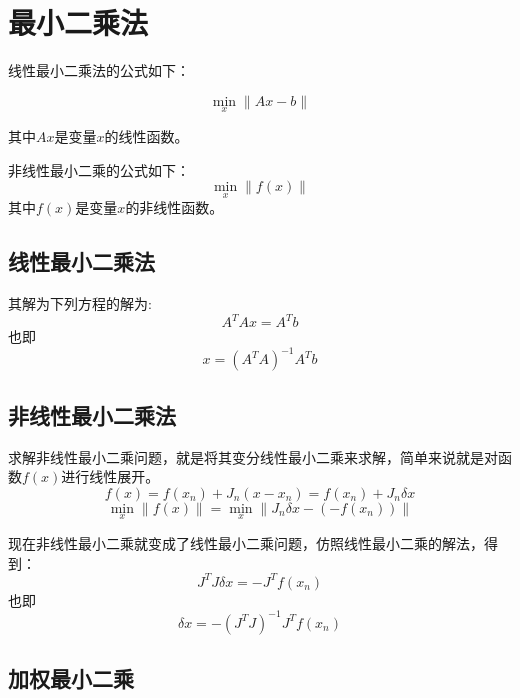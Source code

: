 \documentclass[]{elegantbook}
\begin{document}
\section{最小二乘法}
线性最小二乘法的公式如下：

\begin{equation}
	\min_{x}\|Ax-b\|
\end{equation}

其中$Ax$是变量$x$的线性函数。


非线性最小二乘的公式如下：
\begin{equation}
	\min_{x} \|f(x)\|
\end{equation}
其中$f(x)$是变量$x$的非线性函数。


\subsection{线性最小二乘法}

其解为下列方程的解为:
\begin{equation}
A^TAx = A^Tb
\end{equation}
也即
\begin{equation}
x = (A^TA)^{-1}A^Tb
\end{equation}



\subsection{非线性最小二乘法}\label{appendix:non-linear-least-square}
求解非线性最小二乘问题，就是将其变分线性最小二乘来求解，简单来说就是对函数$f(x)$进行线性展开。
\begin{equation}
	f(x) = f(x_n) + J_n(x - x_n) = f(x_n) + J_n\delta x
\end{equation}
\begin{equation}
	\min_{x}\|f(x)\| = \min_{x}\|J_n\delta x - (-f(x_n))\|
\end{equation}

现在非线性最小二乘就变成了线性最小二乘问题，仿照线性最小二乘的解法，得到：
\begin{equation}
	J^TJ\delta x = -J^Tf(x_n)
\end{equation}
也即
\begin{equation}
	\delta x = -(J^TJ)^{-1}J^Tf(x_n)
\end{equation}


\subsection{加权最小二乘}
\end{document}
